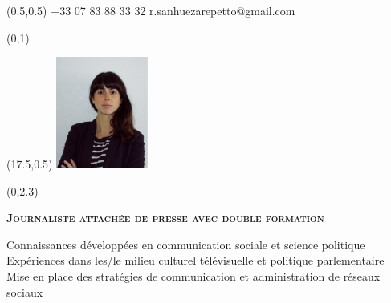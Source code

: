 \documentclass[30pt, french]{tccv}
\begin{document}
\begin{upshape}
\fontsize{9pt}{1em}\color{text}\selectfont





\begin{textblock}{6.5}(0.5,0.5)
    {+33 07 83 88 33 32}
    {r.sanhuezarepetto@gmail.com}
\end{textblock}

\begin{textblock}{21}(0,1)
\end{textblock}

\begin{textblock}{21}(17.5,0.5)
		\includegraphics[width=3cm]{../Figure/Rocio3.png}
\end{textblock}  



\begin{textblock}{21}(0,2.3)

\begin{center}
\fontsize{10pt}{1.5em}\color{text}\bodyfontlight\upshape\selectfont

	{\fontsize{14pt}{5em}\scshape\bfseries Journaliste attachée de presse avec double formation \\} 

	\vspace{5pt}
Connaissances développées en communication sociale et science politique 			 \\
Expériences dans les/le milieu culturel télévisuelle et politique parlementaire 		 \\
Mise en place des stratégies de communication et administration de réseaux sociaux 		\\

\end{center}
\end{textblock}  







\end{upshape}
\end{document}
